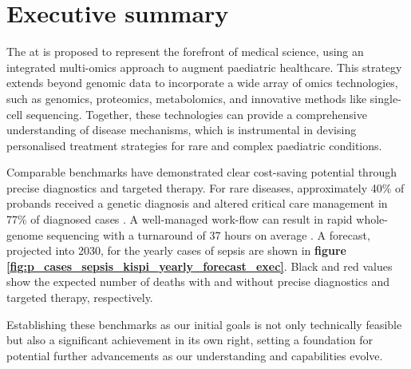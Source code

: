 \section{Executive summary}

The \pmu at \kispi is proposed to represent the forefront of medical science, using an integrated multi-omics approach to augment paediatric healthcare. 
This strategy extends beyond genomic data to incorporate a wide array of omics technologies, such as genomics, proteomics, metabolomics, and innovative methods like single-cell sequencing. 
Together, these technologies  can provide a comprehensive understanding of disease mechanisms, which is instrumental in devising personalised treatment strategies for rare and complex paediatric conditions.

Comparable benchmarks have demonstrated clear cost-saving potential through precise diagnostics and targeted therapy.
For rare diseases, approximately 40\% of probands received a genetic diagnosis 
\citep{wright2023genomic, wojcik2024genome}
and altered critical care management in 77\% of diagnosed cases \citep{lunke2023integrated}.
A well-managed work-flow can result in rapid whole-genome sequencing with a turnaround of 37 hours on average
 \citep{abou2023rapid}.
A forecast, projected into 2030, for the yearly cases of sepsis are shown in 
\textbf{figure
\ref{fig:p_cases_sepsis_kispi_yearly_forecast_exec}}.
Black and red values show the expected number of deaths with and without  precise diagnostics and targeted therapy, respectively. 


Establishing these benchmarks as our initial goals is not only technically feasible but also a significant achievement in its own right, setting a foundation for potential further advancements as our understanding and capabilities evolve.

